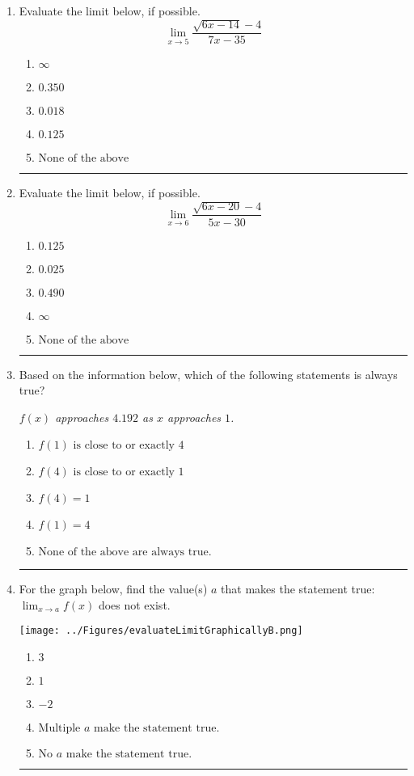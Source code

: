 \documentclass[14pt]{extbook}
\newcommand{\litem}[1]{\item#1\hspace*{-1cm}\rule{\textwidth}{0.4pt}}
\begin{document}
\begin{enumerate}
{\begin{enumerate}[label=\Alph*.]
\end{enumerate} }
\litem{
Evaluate the limit below, if possible.\[ \lim_{x \rightarrow 5} \frac{\sqrt{6x - 14} - 4}{7x - 35} \]\begin{enumerate}[label=\Alph*.]
\item \( \infty \)
\item \( 0.350 \)
\item \( 0.018 \)
\item \( 0.125 \)
\item \( \text{None of the above} \)

\end{enumerate} }
\litem{
Evaluate the limit below, if possible.\[ \lim_{x \rightarrow 6} \frac{\sqrt{6x - 20} - 4}{5x - 30} \]\begin{enumerate}[label=\Alph*.]
\item \( 0.125 \)
\item \( 0.025 \)
\item \( 0.490 \)
\item \( \infty \)
\item \( \text{None of the above} \)

\end{enumerate} }
\litem{
Based on the information below, which of the following statements is always true?
\begin{center}
    \textit{ $f(x)$ approaches $4.192$ as $x$ approaches $1$. }
\end{center}
\begin{enumerate}[label=\Alph*.]
\item \( f(1) \text{ is close to or exactly } 4 \)
\item \( f(4) \text{ is close to or exactly } 1 \)
\item \( f(4) = 1 \)
\item \( f(1) = 4 \)
\item \( \text{None of the above are always true.} \)

\end{enumerate} }
\litem{
For the graph below, find the value(s) $a$ that makes the statement true: $ \displaystyle \lim_{x \rightarrow a} f(x)$ does not exist.
\begin{center}
    \texttt{[image: ../Figures/evaluateLimitGraphicallyB.png]}
\end{center}
\begin{enumerate}[label=\Alph*.]
\item \( 3 \)
\item \( 1 \)
\item \( -2 \)
\item \( \text{Multiple } a \text{ make the statement true}. \)
\item \( \text{No } a \text{ make the statement true}. \)


\end{enumerate}}
\end{enumerate}
\end{document}
